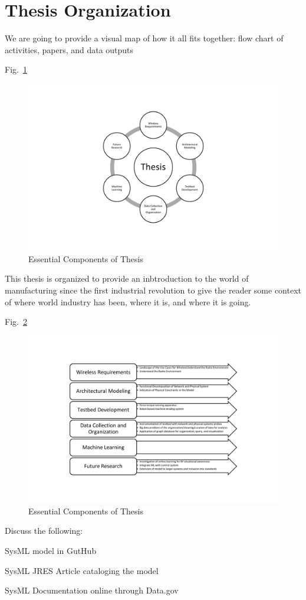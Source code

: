 
\section{Thesis Organization}

We are going to provide a visual map of how it all fits together: flow chart of activities, papers, and data outputs 

Fig.~\ref{intro:thesis-org:fig:essentials}

\begin{figure}[!tbp]
	\includegraphics[width=1.0\textwidth]{chapter-intro/diagrams/Slide1}
	\caption{Essential Components of Thesis}\label{intro:thesis-org:fig:essentials}
\end{figure}


This thesis is organized to provide an inbtroduction to the world of manufacturing since the first industrial revolution to give the reader some context of where world industry has been, where it is, and where it is going.

Fig.~\ref{intro:thesis-org:fig:outline}

\begin{figure}[!tbp]
	\includegraphics[width=1.0\textwidth]{chapter-intro/diagrams/Slide2}
	\caption{Essential Components of Thesis}\label{intro:thesis-org:fig:outline}
\end{figure}


Discuss the following:

SysML model in GutHub ~\cite{Candell2018SysML.GitHub}

SysML JRES Article cataloging the model~\cite{Candell2018SysML.JRES}

SysML Documentation online through Data.gov~\cite{Candell2018SysML.DATA}

